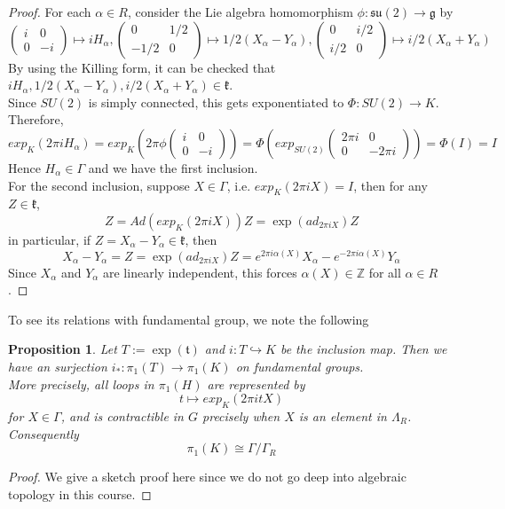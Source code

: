 \documentclass[11pt]{book}
\newtheorem{proposition}[theorem]{Proposition}
\newcommand{\bb}[1]{\mathbb{#1}}
\newcommand{\mf}[1]{\mathfrak{#1}}
\begin{document}
\begin{proof}
For each $\alpha \in R$, consider the Lie algebra homomorphism $\phi: \mf{su}(2) \to \mf{g}$ by
$$\left( \begin{array}{cc}
i & 0  \\
0 & -i  \end{array} \right) \mapsto i H_{\alpha}, \left( \begin{array}{cc}
0 & 1/2  \\
-1/2 & 0  \end{array} \right) \mapsto 1/2(X_{\alpha} - Y_{\alpha}),  \left( \begin{array}{cc}
0 & i/2  \\
i/2 & 0  \end{array} \right) \mapsto i/2(X_{\alpha} + Y_{\alpha})$$
By using the Killing form, it can be checked that $i H_{\alpha}, 1/2(X_{\alpha} - Y_{\alpha}), i/2(X_{\alpha} + Y_{\alpha}) \in \mf{k}$.\\
Since $SU(2)$ is simply connected, this gets exponentiated to $\Phi: SU(2) \to K$. Therefore,
$$exp_K (2\pi iH_{\alpha}) = exp_K (2\pi \phi \left( \begin{array}{cc}
i & 0  \\
0 & -i  \end{array} \right)) = \Phi (exp_{SU(2)} \left( \begin{array}{cc}
2\pi i & 0  \\
0 & -2\pi i  \end{array} \right)) = \Phi(I) = I$$
Hence $H_{\alpha} \in \Gamma$ and we have the first inclusion.\\

For the second inclusion, suppose $X \in \Gamma$, i.e. $exp_K(2\pi iX) = I$, then for any $Z \in \mf{k}$,
$$Z = Ad(exp_K(2\pi i X))Z = \exp(ad_{2\pi i X})Z$$
in particular, if $Z = X_{\alpha} - Y_{\alpha} \in \mf{k}$, then
$$X_{\alpha} - Y_{\alpha} = Z = \exp(ad_{2\pi i X})Z = e^{2\pi i \alpha(X)}X_{\alpha} - e^{-2\pi i \alpha(X)}Y_{\alpha}$$
Since $X_{\alpha}$ and $Y_{\alpha}$ are linearly independent, this forces $\alpha(X) \in \bb{Z}$ for all $\alpha \in R$.
\end{proof}

To see its relations with fundamental group, we note the following
\begin{proposition}
Let $T := \exp(\mf{t})$ and $i: T \hookrightarrow K$ be the inclusion map. Then we have an surjection $i_*: \pi_1(T) \to \pi_1(K)$ on fundamental groups. \\
More precisely, all loops in $\pi_1(H)$ are represented by
$$t \mapsto exp_K(2\pi it X)$$
for $X \in \Gamma$, and is contractible in $G$ precisely when $X$ is an element in $\Lambda_R$. Consequently
$$\pi_1(K) \cong \Gamma/\Gamma_R$$
\end{proposition}
\begin{proof}
We give a sketch proof here since we do not go deep into algebraic topology in this course.
\end{proof}
\end{document}
